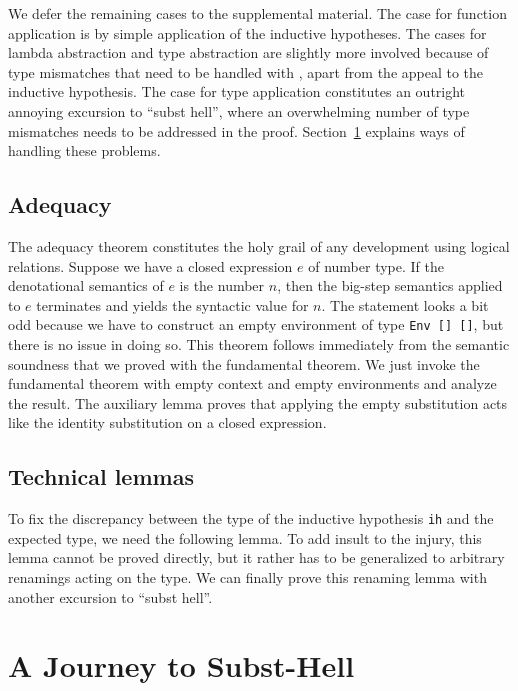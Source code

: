 \documentclass[acmsmall,anonymous,review,screen]{acmart}
\begin{document}
We defer the remaining cases to the supplemental material. The case
for function application is by simple application of the inductive
hypotheses.
The cases for lambda abstraction and type abstraction are slightly more involved because of
type mismatches that need to be handled with {\Asubst}, apart from the
appeal to the inductive hypothesis.
The case for type application constitutes an outright annoying
excursion to ``subst hell'', where an overwhelming number of type
mismatches needs to be addressed in the proof. Section~\ref{sec:subst-hell} explains
ways of handling these problems.

\subsection{Adequacy}
\label{sec:adequacy}

The adequacy theorem constitutes the holy grail of any development
using logical relations.
Suppose we have a closed expression $e$ of number type.
If the denotational semantics of $e$ is the number $n$, then the big-step
semantics applied to $e$ terminates and yields the syntactic value for
$n$.
The statement looks a bit odd because we have to construct an empty
environment of type \texttt{Env [] {\Anull} []}, but there is no issue in doing so.
\FundamentalAdequacyType
This theorem follows immediately from the semantic soundness that we proved with the
fundamental theorem.
\FundamentalAdequacyBody
We just invoke the fundamental theorem with empty context and empty
environments and analyze the result. The auxiliary lemma
{\ACsubClosed} proves that applying the empty substitution acts like
the identity substitution on a closed expression.
\FundamentalCsubClosed


\subsection{Technical lemmas}
\label{sec:technical-lemmas}

\LRVrenMCGLookupType
\LRVrenMCGLookupBody

To fix the discrepancy between the type of the inductive hypothesis
\texttt{ih} and the expected type, we need the following lemma.
\LRVrenLRVwk
To add insult to the injury, this lemma cannot be proved directly, but
it rather has to be generalized to arbitrary renamings acting on the
type.
We can finally prove this renaming lemma with another excursion to
``subst hell''.
\LRVrenLRVrenEqType


\section{A Journey to Subst-Hell}
\label{sec:subst-hell}
\end{document}
